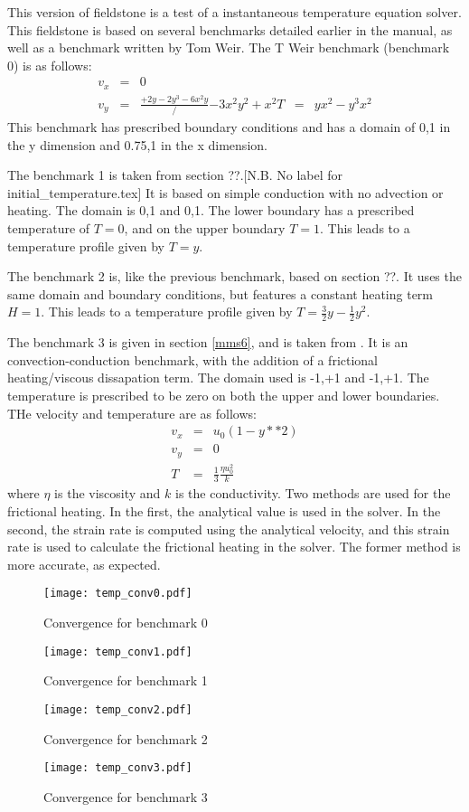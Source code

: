 This version of fieldstone is a test of a instantaneous temperature equation solver.
This fieldstone is based on several benchmarks detailed earlier  in the manual, as well as a benchmark written by Tom Weir.
The T Weir benchmark (benchmark 0) is as follows:
\begin{eqnarray}
v_x &=& 0 \\
v_y &=& \frac{+2y-2y^3-6x^2y}/{-3x^2y^2+x^2}
T   &=& y x^2-y^3x^2
\end{eqnarray}
This benchmark has prescribed boundary conditions and has a domain of 0,1 in the y dimension and 0.75,1 in the x dimension.

The benchmark 1 is taken from section ??.[N.B. No label for initial_temperature.tex] It is based on simple conduction with no advection or heating. The domain is 0,1 and 0,1. The lower boundary has a prescribed temperature of $T=0$, and on the upper boundary $T=1$. This leads to a temperature profile given by $T=y$.

The benchmark 2 is, like the previous benchmark, based on section ??. It uses the same domain and boundary conditions, but features a constant heating term $H=1$. This leads to a temperature profile given by $T=\frac{3}{2}y-\frac{1}{2}y^2$.

The benchmark 3 is given in section \ref{mms6}, and is taken from \cite{ilpe07}. It is an convection-conduction benchmark, with the addition of a frictional heating/viscous dissapation term. The domain used is -1,+1 and -1,+1. The temperature is prescribed to be zero on both the upper and lower boundaries. THe velocity and temperature are as follows:
\begin{eqnarray}
v_x &=&  u_0(1-y**2) \\
v_y &=& 0 \\
T   &=& \frac{1}{3} \frac{\eta u_0^2}{k}
\end{eqnarray}
where $\eta$ is the viscosity and $k$ is the conductivity.
Two methods are used for the frictional heating. In the first, the analytical value is used in the solver. In the second, the strain rate is computed using the analytical velocity, and this strain rate is used to calculate the frictional heating in the solver. The former method is more accurate, as expected.

\begin{figure}
	\centering
	\texttt{[image: temp\_conv0.pdf]}
	\caption{Convergence for benchmark 0}
\end{figure}

\begin{figure}
	\centering
	\texttt{[image: temp\_conv1.pdf]}
	\caption{Convergence for benchmark 1}
\end{figure}

\begin{figure}
	\centering
	\texttt{[image: temp\_conv2.pdf]}
	\caption{Convergence for benchmark 2}
\end{figure}

\begin{figure}
	\centering
	\texttt{[image: temp\_conv3.pdf]}
	\caption{Convergence for benchmark 3}
\end{figure}